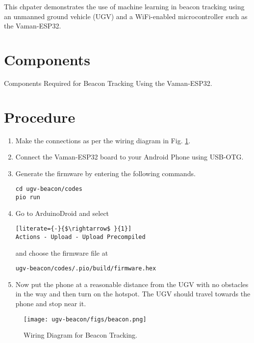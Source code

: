This chpater demonstrates the use of machine learning in beacon tracking using 
an unmanned ground vehicle (UGV) and a WiFi-enabled microcontroller such as the 
Vaman-ESP32.

\section{Components}
\begin{table}[!ht]
    \centering
    
    \caption{Components Required for Beacon Tracking Using the Vaman-ESP32.}
    \label{tab:ugv-beacon-components}
\end{table}

\section{Procedure}
\begin{enumerate}
    \item Make the connections as per the wiring diagram in Fig. \ref{fig:beacon}.
    \item Connect the Vaman-ESP32 board to your Android Phone using USB-OTG.
    \item Generate the firmware by entering the following commands.
        \begin{lstlisting}
cd ugv-beacon/codes
pio run
        \end{lstlisting}
    \item Go to ArduinoDroid and select
        \begin{lstlisting}[literate={-}{$\rightarrow$ }{1}]
Actions - Upload - Upload Precompiled
        \end{lstlisting}
    and choose the firmware file at
        \begin{lstlisting}
ugv-beacon/codes/.pio/build/firmware.hex
        \end{lstlisting}
    \item Now put the phone at a reasonable distance from the UGV with no 
    obstacles in the way and then turn on the hotspot. The UGV should travel
    towards the phone and stop near it.
\end{enumerate}

\begin{figure}[!ht]
    \centering
    \texttt{[image: ugv-beacon/figs/beacon.png]}
    \caption{Wiring Diagram for Beacon Tracking.}
    \label{fig:beacon}
\end{figure}

